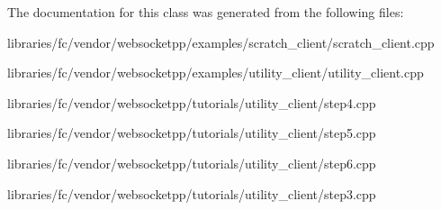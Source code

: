 The documentation for this class was generated from the following files\+:\begin{DoxyCompactItemize}
\item 
libraries/fc/vendor/websocketpp/examples/scratch\+\_\+client/scratch\+\_\+client.\+cpp\item 
libraries/fc/vendor/websocketpp/examples/utility\+\_\+client/utility\+\_\+client.\+cpp\item 
libraries/fc/vendor/websocketpp/tutorials/utility\+\_\+client/step4.\+cpp\item 
libraries/fc/vendor/websocketpp/tutorials/utility\+\_\+client/step5.\+cpp\item 
libraries/fc/vendor/websocketpp/tutorials/utility\+\_\+client/step6.\+cpp\item 
libraries/fc/vendor/websocketpp/tutorials/utility\+\_\+client/step3.\+cpp\end{DoxyCompactItemize}
